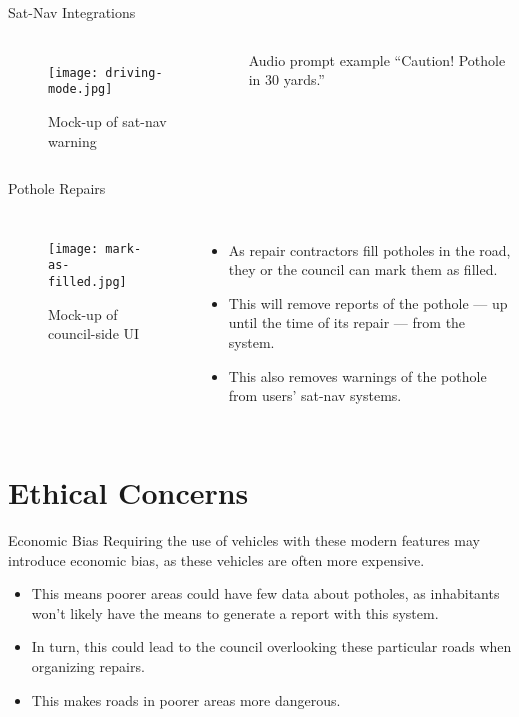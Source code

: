 \documentclass{beamer}
\begin{document}
\begin{frame}{Sat-Nav Integrations}
    \begin{columns}
        \begin{figure}
            \texttt{[image: driving-mode.jpg]}
            \caption{Mock-up of sat-nav warning}
        \end{figure}


        \begin{exampleblock}{Audio prompt example}
            ``Caution! Pothole in 30 yards.''
        \end{exampleblock}
    \end{columns}
\end{frame}

\begin{frame}{Pothole Repairs}
    \begin{columns}

        \begin{figure}
            \texttt{[image: mark-as-filled.jpg]}
            \caption{Mock-up of council-side UI}
        \end{figure}


        \begin{itemize}
            \item As repair contractors fill potholes in the road, they or the council can mark them as filled.
            \item This will remove reports of the pothole --- up until the time of its repair --- from the system.
            \item This also removes warnings of the pothole from users' sat-nav systems.
        \end{itemize}
    \end{columns}
\end{frame}

\section{Ethical Concerns}

\begin{frame}{Economic Bias}
Requiring the use of vehicles with these modern features may introduce economic bias, as these vehicles are often more expensive.

\begin{itemize}
    \item This means poorer areas could have few data about potholes, as inhabitants won't likely have the means to generate a report with this system.
    \item In turn, this could lead to the council overlooking these particular roads when organizing repairs.
    \item This makes roads in poorer areas more dangerous.
\end{itemize}
\end{frame}
\end{document}

